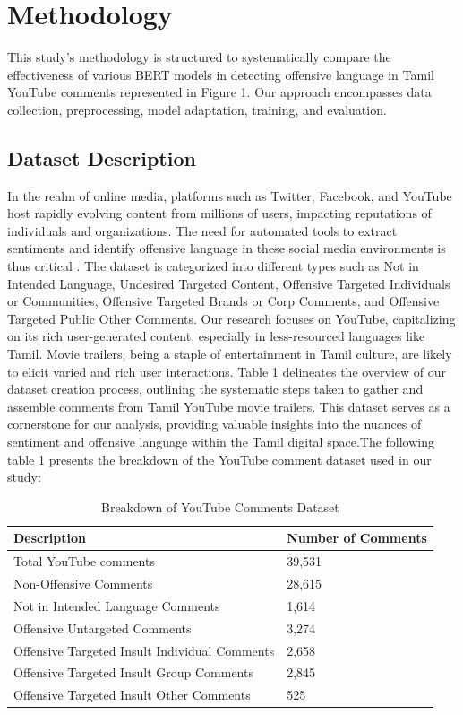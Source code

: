 \documentclass{svproc}
\begin{document}
\section{Methodology}

This study's methodology is structured to systematically compare the effectiveness of various BERT models\cite{divya2023transformer} in detecting offensive language in Tamil YouTube comments represented in Figure 1. Our approach encompasses data collection, preprocessing, model adaptation, training, and evaluation.

\subsection{Dataset Description}

In the realm of online media\cite{abeera2023social}, platforms such as Twitter, Facebook, and YouTube host rapidly evolving content from millions of users, impacting reputations of individuals and organizations. The need for automated tools to extract sentiments and identify offensive language in these social media environments is thus critical \cite{paul2023context}.
The dataset is categorized into different types such as Not in Intended Language, Undesired Targeted Content, Offensive Targeted Individuals or Communities, Offensive Targeted Brands or Corp Comments, and Offensive Targeted Public Other Comments. Our research focuses on YouTube, capitalizing on its rich user-generated content, especially in less-resourced languages like Tamil.
Movie trailers, being a staple of entertainment in Tamil culture, are likely to elicit varied and rich user interactions. Table 1 delineates the overview of our dataset creation process, outlining the systematic steps taken to gather and assemble comments from Tamil YouTube movie trailers. This dataset serves as a cornerstone for our analysis, providing valuable insights into the nuances of sentiment and offensive language within the Tamil digital space.The following table 1 presents the breakdown of the YouTube comment dataset used in our study\cite{chakravarthi2021lre}:

\begin{table}
\caption{Breakdown of YouTube Comments Dataset}\label{tab1}
\begin{tabular}{|l|l|}
\hline
\textbf{Description} & \textbf{Number of Comments} \\
\hline
Total YouTube comments & 39,531 \\
Non-Offensive Comments & 28,615 \\
Not in Intended Language Comments & 1,614 \\
Offensive Untargeted Comments & 3,274 \\
Offensive Targeted Insult Individual Comments & 2,658 \\
Offensive Targeted Insult Group Comments & 2,845 \\
Offensive Targeted Insult Other Comments & 525 \\
\hline
\end{tabular}
\end{table}
\end{document}
